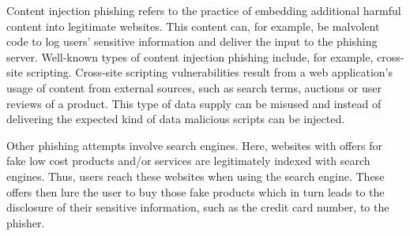 \begin{description}[leftmargin=0cm]
	\item[Content Injection Phishing] Content injection phishing refers to the practice of embedding additional harmful content into legitimate websites. This content can, for example, be malvolent code to log users' sensitive information and deliver the input to the phishing server. Well-known types of content injection phishing include, for example, cross-site scripting. Cross-site scripting vulnerabilities result from a web application's usage of content from external sources, such as search terms, auctions or user reviews of a product. This type of data supply can be misused and instead of delivering the expected kind of data malicious scripts can be injected.
	\item[Search Engine Phishing] Other phishing attempts involve search engines. Here, websites with offers for fake low cost products and/or services are legitimately indexed with search engines. Thus, users reach these websites when using the search engine. These offers then lure the user to buy those fake products which in turn leads to the disclosure of their sensitive information, such as the credit card number, to the phisher.
\end{description}

